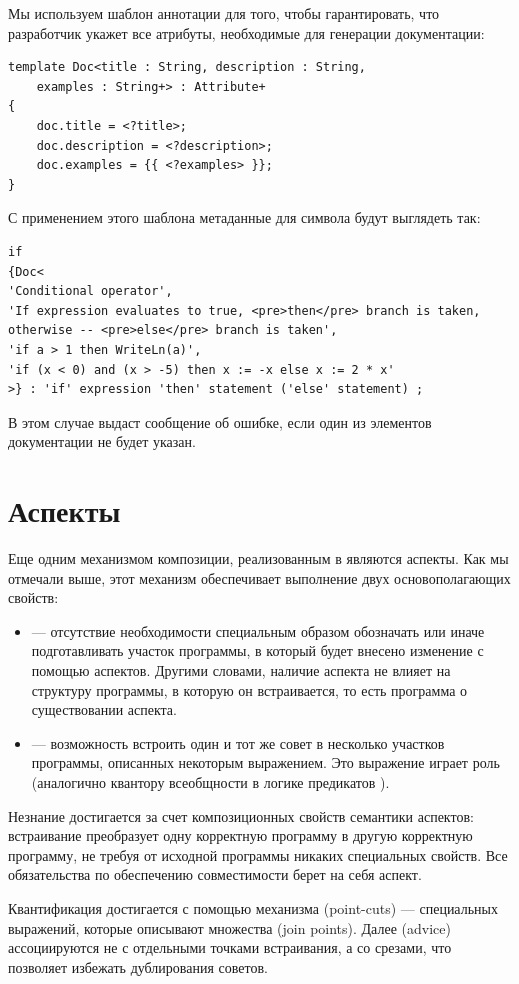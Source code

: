 Мы используем шаблон аннотации для того, чтобы гарантировать, что разработчик укажет все атрибуты, необходимые для генерации документации:
\begin{lstlisting}
template Doc<title : String, description : String, 
	examples : String+> : Attribute+ 
{
	doc.title = <?title>;
	doc.description = <?description>;
	doc.examples = {{ <?examples> }};
}
\end{lstlisting}
С применением этого шаблона метаданные для символа  будут выглядеть так:
\begin{lstlisting}[xleftmargin=0.6cm]
if
{Doc<
'Conditional operator',
'If expression evaluates to true, <pre>then</pre> branch is taken,
otherwise -- <pre>else</pre> branch is taken',
'if a > 1 then WriteLn(a)',
'if (x < 0) and (x > -5) then x := -x else x := 2 * x'
>} : 'if' expression 'then' statement ('else' statement) ;
\end{lstlisting}
В этом случае  выдаст сообщение об ошибке, если один из элементов документации не будет указан.

\chapter{Аспекты}%
%
Еще одним механизмом композиции, реализованным в  являются аспекты. Как мы отмечали выше, этот механизм обеспечивает выполнение двух основополагающих свойств:
\begin{itemize}
\item {} --- отсутствие необходимости специальным образом обозначать или иначе подготавливать участок программы, в который будет внесено изменение с помощью аспектов. Другими словами, наличие аспекта не влияет на структуру программы, в которую он встраивается, то есть программа  о существовании аспекта.
\item {} --- возможность встроить один и тот же совет в несколько участков программы, описанных некоторым выражением. Это выражение играет роль  (аналогично квантору всеобщности в логике предикатов \cite{???}).
\end{itemize}

Незнание достигается за счет композиционных свойств семантики аспектов: встраивание преобразует одну корректную программу в другую корректную программу, не требуя от исходной программы никаких специальных свойств. Все обязательства по обеспечению совместимости берет на себя аспект.

Квантификация достигается с помощью механизма  (point-cuts) --- специальных выражений, которые описывают множества  (join points). Далее  (advice) ассоциируются не с отдельными точками встраивания, а со срезами, что позволяет избежать дублирования советов.

